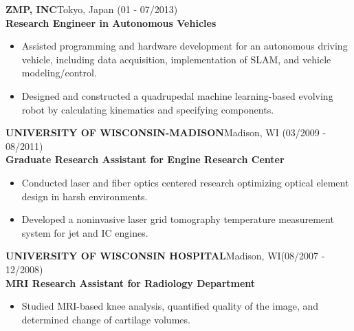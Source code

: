\documentclass[10pt,letterpaper]{article}
\begin{document}
\MakeUppercase{\bf ZMP, Inc}\hfill{Tokyo, Japan }{(01 - 07/2013)}\\
{\bf Research Engineer in Autonomous Vehicles}
\begin{itemize}
\item Assisted programming and hardware development for an autonomous driving vehicle, including data acquisition, implementation of SLAM, and vehicle modeling/control.
\item Designed and constructed a quadrupedal machine learning-based evolving robot by calculating kinematics and specifying components.
\end{itemize}

\MakeUppercase{\bf University of Wisconsin-Madison}\hfill{Madison, WI}{ (03/2009 - 08/2011)}\\{\bf Graduate Research Assistant for Engine Research Center}
\begin{itemize}
\item Conducted laser and fiber optics centered research optimizing optical element design in harsh environments. 
\item Developed a noninvasive laser grid tomography temperature measurement system for jet and IC engines.
\end{itemize}

\MakeUppercase{\bf University of Wisconsin Hospital}\hfill{Madison, WI}{ {(08/2007 - 12/2008)}}\\{\bf MRI Research Assistant for Radiology Department}
\begin{itemize}
\item Studied MRI-based knee analysis, quantified quality of the image, and determined change of cartilage volumes.
\end{itemize}

\vspace{-5mm}
\end{document}
